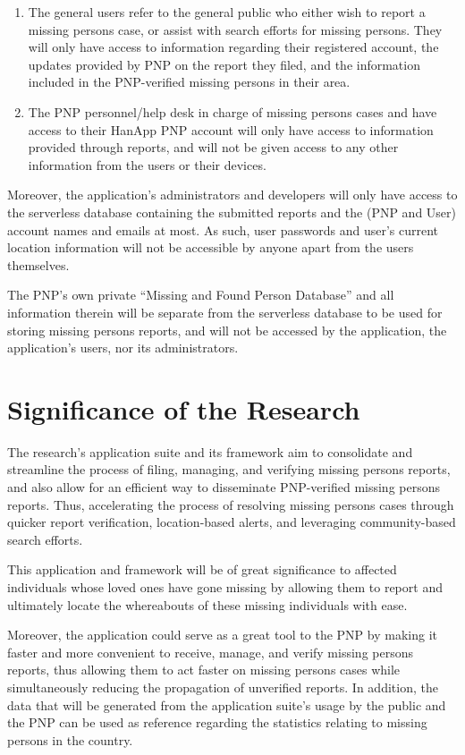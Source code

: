 \begin{enumerate}
    \item The general users refer to the general public who either wish to report a missing persons case, or assist with search efforts for missing persons. They will only have access to information regarding their registered account, the updates provided by PNP on the report they filed, and the information included in the PNP-verified missing persons in their area.
    \item The PNP personnel/help desk in charge of missing persons cases and have access to their HanApp PNP account will only have access to information provided through reports, and will not be given access to any other information from the users or their devices.
\end{enumerate}

Moreover, the application’s administrators and developers will only have access to the serverless database containing the submitted reports and the (PNP and User) account names and emails at most. As such, user passwords and user’s current location information will not be accessible by anyone apart from the users themselves. 

The PNP’s own private “Missing and Found Person Database” and all information therein will be separate from the serverless database to be used for storing missing persons reports, and will not be accessed by the application, the application’s users, nor its administrators.

\section{Significance of the Research}
\label{sec:significance}
The research’s application suite and its framework aim to consolidate and streamline the process of filing, managing, and verifying missing persons reports, and also allow for an efficient way to disseminate PNP-verified missing persons reports. Thus, accelerating the process of resolving missing persons cases through quicker report verification, location-based alerts, and leveraging community-based search efforts. 

This application and framework will be of great significance to affected individuals whose loved ones have gone missing by allowing them to report and ultimately locate the whereabouts of these missing individuals with ease.

Moreover, the application could serve as a great tool to the PNP by making it faster and more convenient to receive, manage, and verify missing persons reports, thus allowing them to act faster on missing persons cases while simultaneously reducing the propagation of unverified reports. In addition, the data that will be generated from the application suite’s usage by the public and the PNP can be used as reference regarding the statistics relating to missing persons in the country. 


